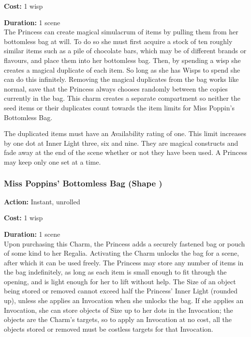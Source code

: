 \noindent \textbf{Cost:} 1 wisp

\noindent \textbf{Duration:} 1 scene \\

\noindent The Princess can create magical simulacrum of items by pulling them from her bottomless bag at will. To do so she must first acquire a stock of ten roughly similar items such as a pile of chocolate bars, which may be of different brands or flavours, and place them into her bottomless bag. Then, by spending a wisp she creates a magical duplicate of each item. So long as she has Wisps to spend she can do this infinitely. Removing the magical duplicates from the bag works like normal, save that the Princess always chooses randomly between the copies currently in the bag. This charm creates a separate compartment so neither the seed items or their duplicates count towards the item limits for Miss Poppin's Bottomless Bag. 

The duplicated items must have an Availability rating of one. This limit increases by one dot at Inner Light three, six and nine. They are magical constructs and fade away at the end of the scene whether or not they have been used. A Princess may keep only one set at a time. 

\subsubsection*{Miss Poppins' Bottomless Bag (Shape \textbullet\textbullet)}

\noindent \textbf{Action:} Instant, unrolled

\noindent \textbf{Cost:} 1 wisp

\noindent \textbf{Duration:} 1 scene \\

\noindent Upon purchasing this Charm, the Princess adds a securely fastened bag or pouch of some kind to her Regalia. Activating the Charm unlocks the bag for a scene, after which it can be used freely. The Princess may store any number of items in the bag indefinitely, as long as each item is small enough to fit through the opening, and is light enough for her to lift without help. The Size of an object being stored or removed cannot exceed half the Princess' Inner Light (rounded up), unless she applies an Invocation when she unlocks the bag. If she applies an Invocation, she can store objects of Size up to her dots in the Invocation; the objects are the Charm's targets, so to apply an Invocation at no cost, all the objects stored or removed must be costless targets for that Invocation.

